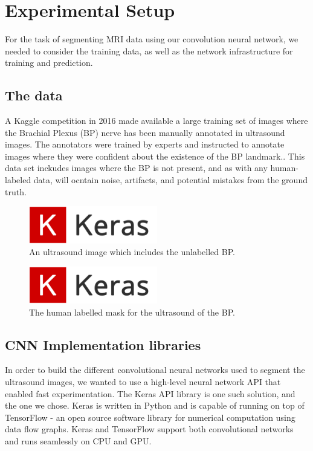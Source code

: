 \documentclass[letterpaper]{article}
\begin{document}
\section{Experimental Setup}
For the task of segmenting MRI data using our convolution neural network, we needed to consider the training data, as well as the network infrastructure for training and prediction.

\subsection{The data}
A Kaggle competition in 2016 made available a large training set of images where the Brachial Plexus (BP) nerve has been manually annotated in ultrasound images. The annotators were trained by experts and instructed to annotate images where they were confident about the existence of the BP landmark.. This data set inckudes images where the BP is not present, and as with any human-labeled data, will ocntain noise, artifacts, and potential mistakes from the ground truth. 

 \begin{figure}[H]
  \centerline{\includegraphics[width=0.5\textwidth]{Images/Keras.png}}
  \caption{An ultrasound image which includes the unlabelled BP.}
  \label{fig:BPInUltrasound}
\end{figure}

 \begin{figure}[H]
  \centerline{\includegraphics[width=0.5\textwidth]{Images/Keras.png}}
  \caption{The human labelled mask for the ultrasound of the BP.}
  \label{fig:BPMask}
\end{figure}

\subsection{CNN Implementation libraries}
In order to build the different convolutional neural networks used to segment the ultrasound images, we wanted to use a high-level neural network API that enabled fast experimentation. The Keras API library is one such solution, and the one we chose. Keras is written in Python and is capable of running on top of TensorFlow - an open source software library for numerical computation using data flow graphs. Keras and TensorFlow support both convolutional networks and runs seamlessly on CPU and GPU. 
\end{document}
